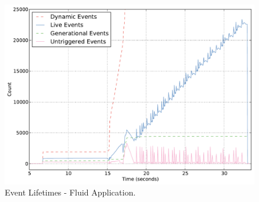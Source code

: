 
\begin{figure}
\begin{center}
\includegraphics[scale=0.33]{figs/event_lifetimes.pdf}
\end{center}
\vspace{-2mm}
\caption{Event Lifetimes - Fluid Application.\label{fig:eventlife}}
\vspace{-4mm}
\end{figure}


